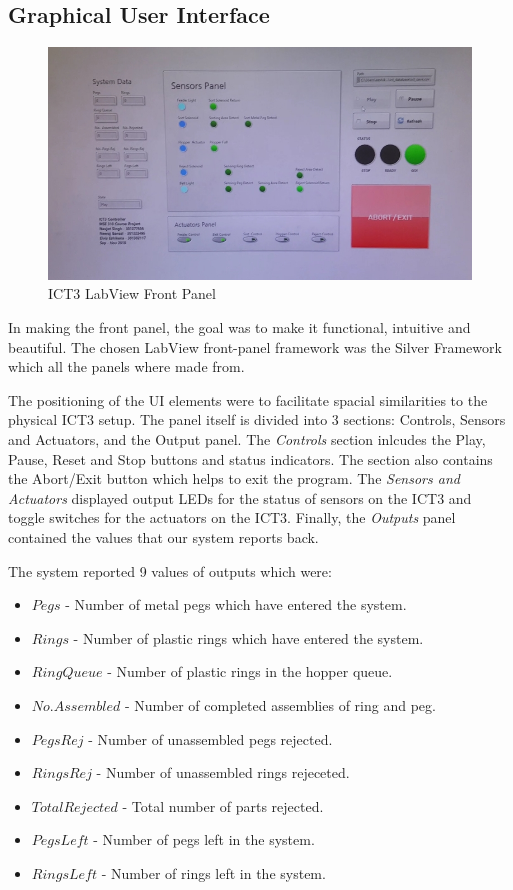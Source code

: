 \documentclass[12pt]{article}
\begin{document}
\subsection{Graphical User Interface}
  \label{subsec:gui}
  \begin{figure}[H]
    \centering
    \includegraphics[width=\linewidth]{images/gui.jpg}
    \caption{ICT3 LabView Front Panel}
  \end{figure}

  In making the front panel, the goal was to make it functional, intuitive and beautiful.
  The chosen LabView front-panel framework was the Silver Framework which all the panels
  where made from.

  The positioning of the UI elements were to facilitate spacial similarities to the physical
  ICT3 setup. The panel itself is divided into 3 sections: Controls, Sensors and Actuators, and
  the Output panel. The \textit{Controls} section inlcudes the Play, Pause, Reset and Stop buttons and
  status indicators. The section also contains the Abort/Exit button which helps to exit the program. 
  The \textit{Sensors and Actuators} displayed output LEDs for the status of
  sensors on the ICT3 and toggle switches for the actuators on the ICT3. Finally, the \textit{Outputs}
  panel contained the  values that our system reports back. 
  
  The system reported 9 values of outputs which were:
  \begin{itemize}
    \item $Pegs$ - Number of metal pegs which have entered the system.
    \item $Rings$ - Number of plastic rings which have entered the system.
    \item $RingQueue$ - Number of plastic rings in the hopper queue.
    \item $No.Assembled$ - Number of completed assemblies of ring and peg.
    \item $PegsRej$ - Number of unassembled pegs rejected.
    \item $RingsRej$ - Number of unassembled rings rejeceted.
    \item $TotalRejected$ - Total number of parts rejected.
    \item $PegsLeft$ - Number of pegs left in the system.
    \item $RingsLeft$ - Number of rings left in the system.
  \end{itemize}
\end{document}

